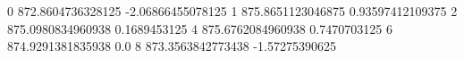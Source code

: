 0 872.8604736328125 -2.06866455078125
1 875.8651123046875 0.93597412109375
2 875.0980834960938 0.1689453125
4 875.6762084960938 0.7470703125
6 874.9291381835938 0.0
8 873.3563842773438 -1.57275390625
